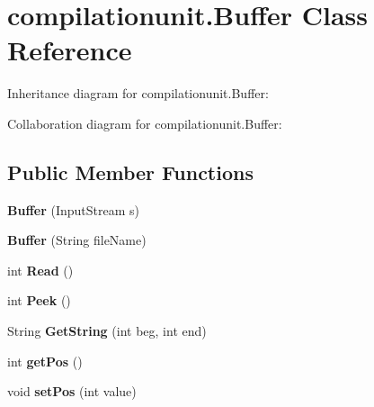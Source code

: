 \hypertarget{classcompilationunit_1_1_buffer}{
\section{compilationunit.Buffer Class Reference}
\label{classcompilationunit_1_1_buffer}
}


Inheritance diagram for compilationunit.Buffer:


Collaboration diagram for compilationunit.Buffer:
\subsection*{Public Member Functions}
\begin{DoxyCompactItemize}
\item 
\hypertarget{classcompilationunit_1_1_buffer_aa7b5b8f40ed13fa6badde924e3a5141f}{
{\bfseries Buffer} (InputStream s)}
\label{classcompilationunit_1_1_buffer_aa7b5b8f40ed13fa6badde924e3a5141f}

\item 
\hypertarget{classcompilationunit_1_1_buffer_ac5419ae9805be79a4d1a2db209692a60}{
{\bfseries Buffer} (String fileName)}
\label{classcompilationunit_1_1_buffer_ac5419ae9805be79a4d1a2db209692a60}

\item 
\hypertarget{classcompilationunit_1_1_buffer_a9cd94fbabf8633ab60874ad3d390c459}{
int {\bfseries Read} ()}
\label{classcompilationunit_1_1_buffer_a9cd94fbabf8633ab60874ad3d390c459}

\item 
\hypertarget{classcompilationunit_1_1_buffer_a5721a088dde05cf06c925430ae29b3d5}{
int {\bfseries Peek} ()}
\label{classcompilationunit_1_1_buffer_a5721a088dde05cf06c925430ae29b3d5}

\item 
\hypertarget{classcompilationunit_1_1_buffer_ac3ee88ae547f6f8f993285309181887b}{
String {\bfseries GetString} (int beg, int end)}
\label{classcompilationunit_1_1_buffer_ac3ee88ae547f6f8f993285309181887b}

\item 
\hypertarget{classcompilationunit_1_1_buffer_a479879ee794881e80b33dffe6236afa2}{
int {\bfseries getPos} ()}
\label{classcompilationunit_1_1_buffer_a479879ee794881e80b33dffe6236afa2}

\item 
\hypertarget{classcompilationunit_1_1_buffer_a3c1031cdd7630017c7e7cf50b73d279e}{
void {\bfseries setPos} (int value)}
\label{classcompilationunit_1_1_buffer_a3c1031cdd7630017c7e7cf50b73d279e}

\end{DoxyCompactItemize}
